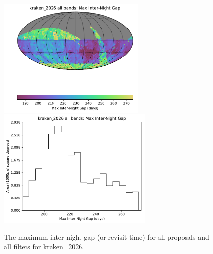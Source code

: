 \documentclass[DM,lsstdraft,authoryear,toc]{lsstdoc}
\begin{document}
\begin{figure}[htb]
\centering
\vskip -0.0in
\includegraphics[height=2.3in]{figures/kraken_2026_Max_Inter-Night_Gap_all_bands_HEAL_SkyMap.pdf}
\includegraphics[height=2.3in]{figures/kraken_2026_Max_Inter-Night_Gap_all_bands_HEAL_Histogram.pdf}
\vskip -0.1in
\caption{The maximum inter-night gap (or revisit time) for all proposals and all filters for kraken\_2026.}
\label{fig:baseline_MAXGapAll}
\end{figure}



%
\end{document}
